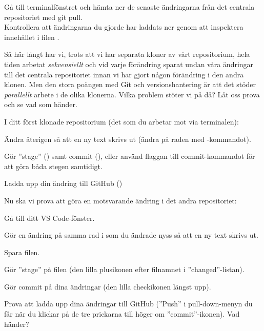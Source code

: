 \begin{Datorarbete}
	\code{[\ref{git-pull-term}]} Gå till terminalfönstret och hämta ner de senaste ändringarna från det centrala repositoriet med git pull.
	\\


	Kontrollera att ändringarna du gjorde har laddats ner genom att inspektera innehållet i filen .

	\item Så här långt har vi, trots att vi har separata kloner av vårt repositorium, hela tiden arbetat \emph{sekvensiellt} och vid varje förändring sparat undan våra ändringar till det centrala repositoriet innan vi har gjort någon förändring i den andra klonen. Men den stora poängen med Git och versionshantering är att det stöder \emph{parallellt} arbete i de olika klonerna. Vilka problem stöter vi på då? Låt oss prova och se vad som händer.


	\code{[\ref{git-conflict-1}]} I ditt först klonade repositorium (det som du arbetar mot via terminalen):
	\begin{Deluppgifter}
		\item Ändra återigen  så att en ny text skrivs ut (ändra på raden med -kommandot).
		\item Gör ''stage'' () samt commit (), eller använd flaggan  till commit-kommandot för att göra båda stegen samtidigt.
		\item Ladda upp din ändring till GitHub ()
	\end{Deluppgifter}

	Nu ska vi prova att göra en motsvarande ändring i det andra repositoriet:
	\begin{Deluppgifter}
		\item Gå till ditt VS Code-fönster.
		\item Gör en ändring på samma rad i  som du ändrade nyss så att en ny text skrivs ut.
		\item Spara filen.
		\item Gör ''stage'' på filen (den lilla plusikonen efter filnamnet i ''changed''-listan).
		\item Gör commit på dina ändringar (den lilla checkikonen längst upp).
		\item Prova att ladda upp dina ändringar till GitHub (''Push'' i pull-down-menyn du får när du klickar på de tre prickarna till höger om ''commit''-ikonen). Vad händer?
	\end{Deluppgifter}


\end{Datorarbete}
